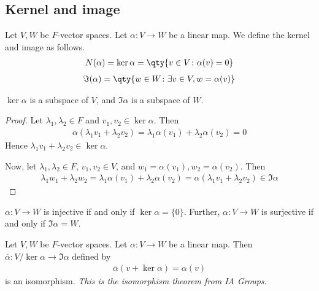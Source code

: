     \subsection{Kernel and image}
    \begin{definition}
        Let $V, W$ be $F$-vector spaces.
        Let $\alpha \colon V \to W$ be a linear map.
        We define the kernel and image as follows.
        \begin{align*}
            N(\alpha) = \ker\alpha = \qty{v \in V \colon \alpha(v) = 0}
        \end{align*}
        \begin{align*}
            \Im(\alpha) = \qty{w \in W \colon \exists v \in V, w = \alpha(v)}
        \end{align*}
    \end{definition}
    \begin{lemma}
        $\ker \alpha$ is a subspace of $V$, and $\Im \alpha$ is a subspace of $W$.
    \end{lemma}
    \begin{proof}
        Let $\lambda_1, \lambda_2 \in F$ and $v_1, v_2 \in \ker \alpha$.
        Then
        \begin{align*}
            \alpha(\lambda_1 v_1 + \lambda_2 v_2) = \lambda_1 \alpha(v_1) + \lambda_2 \alpha(v_2) = 0
        \end{align*}
        Hence $\lambda_1 v_1 + \lambda_2 v_2 \in \ker \alpha$.

        Now, let $\lambda_1, \lambda_2 \in F$, $v_1, v_2 \in V$, and $w_1 = \alpha(v_1), w_2 = \alpha(v_2)$.
        Then
        \begin{align*}
            \lambda_1 w_1 + \lambda_2 w_2 = \lambda_1 \alpha(v_1) + \lambda_2 \alpha(v_2) = \alpha(\lambda_1 v_1 + \lambda_2 v_2) \in \Im \alpha
        \end{align*}
    \end{proof}
    \begin{remark}
        $\alpha \colon V \to W$ is injective if and only if $\ker \alpha = \{ 0 \}$.
        Further, $\alpha \colon V \to W$ is surjective if and only if $\Im \alpha = W$.
    \end{remark}
    \begin{theorem}
        Let $V, W$ be $F$-vector spaces.
        Let $\alpha \colon V \to W$ be a linear map.
        Then $\overline \alpha \colon V / \ker \alpha \to \Im \alpha$ defined by
        \begin{align*}
            \overline \alpha (v + \ker \alpha) = \alpha(v)
        \end{align*}
        is an isomorphism.
        \textit{This is the isomorphism theorem from IA Groups.}
    \end{theorem}
